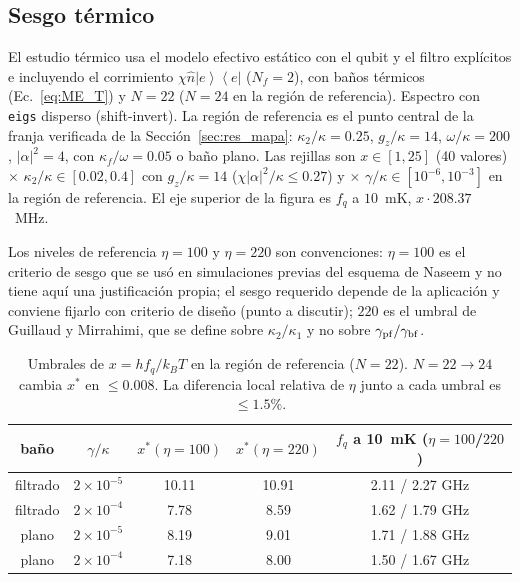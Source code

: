 \documentclass[11pt,a4paper]{article}
\newcommand{\ket}[1]{\left|#1\right\rangle}
\newcommand{\bra}[1]{\left\langle#1\right|}
\newcommand{\Pe}{\ket{e}\!\bra{e}}
\newcommand{\hn}{\hat n}
\theoremstyle{definition}
\begin{document}
\subsection{Sesgo térmico}
\label{sec:res_term}

El estudio térmico usa el modelo efectivo estático con el qubit y el filtro explícitos e incluyendo el corrimiento $\chi\hn\Pe$ ($N_f=2$), con baños térmicos (Ec.~\eqref{eq:ME_T}) y $N=22$ ($N=24$ en la región de referencia). Espectro con \texttt{eigs} disperso (shift-invert). La región de referencia es el punto central de la franja verificada de la Sección~\ref{sec:res_mapa}: $\kappa_2/\kappa=0.25$, $g_z/\kappa=14$, $\omega/\kappa=200$, $|\alpha|^2=4$, con $\kappa_f/\omega=0.05$ o baño plano. Las rejillas son $x\in[1,25]$ (40 valores) $\times$ $\kappa_2/\kappa\in[0.02,0.4]$ con $g_z/\kappa=14$ ($\chi|\alpha|^2/\kappa\leq0.27$) y $\times$ $\gamma/\kappa\in[10^{-6},10^{-3}]$ en la región de referencia. El eje superior de la figura es $f_q$ a $10$~mK, $x\cdot208.37$~MHz.

Los niveles de referencia $\eta=100$ y $\eta=220$ son convenciones: $\eta=100$ es el criterio de sesgo que se usó en simulaciones previas del esquema de Naseem y no tiene aquí una justificación propia; el sesgo requerido depende de la aplicación y conviene fijarlo con criterio de diseño (punto a discutir); $220$ es el umbral de Guillaud y Mirrahimi, que se define sobre $\kappa_2/\kappa_1$ y no sobre $\gamma_{\rm pf}/\gamma_{\rm bf}$.

\begin{table}[h]
\centering
\begin{tabular}{ccccc}
\toprule
baño & $\gamma/\kappa$ & $x^{*}(\eta=100)$ & $x^{*}(\eta=220)$ & $f_q$ a 10~mK ($\eta=100$/$220$)\\
\midrule
filtrado & $2\times10^{-5}$ & 10.11 & 10.91 & 2.11 / 2.27 GHz\\
filtrado & $2\times10^{-4}$ & 7.78 & 8.59 & 1.62 / 1.79 GHz\\
plano & $2\times10^{-5}$ & 8.19 & 9.01 & 1.71 / 1.88 GHz\\
plano & $2\times10^{-4}$ & 7.18 & 8.00 & 1.50 / 1.67 GHz\\
\bottomrule
\end{tabular}
\caption{Umbrales de $x=hf_q/k_BT$ en la región de referencia ($N=22$). $N=22\to24$ cambia $x^{*}$ en $\leq0.008$. La diferencia local relativa de $\eta$ junto a cada umbral es $\leq1.5\%$.}
\label{tab:term}
\end{table}
\end{document}
